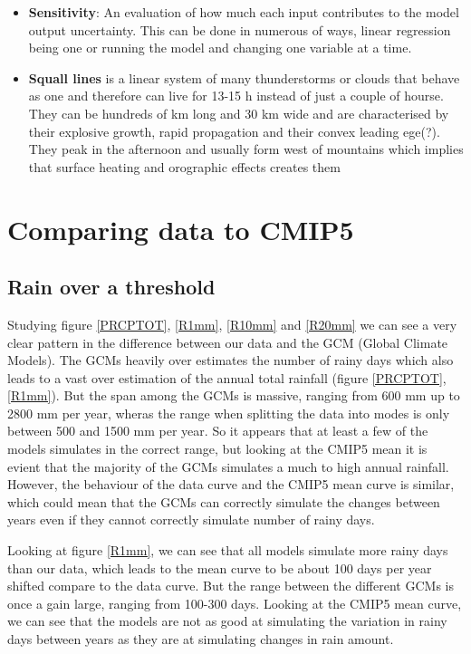 \documentclass{article}
\begin{document}
\begin{itemize}
		\item \textbf{Sensitivity}: An evaluation of how much each input contributes to the model output uncertainty. This can be done in numerous of ways, linear regression being one or running the model and changing one variable at a time.
		\item \textbf{Squall lines} is a linear system of many thunderstorms or clouds that behave as one and therefore can live for 13-15 h instead of just a couple of hourse. They can be hundreds of km long and 30 km wide and are characterised by their explosive growth, rapid propagation and their convex leading ege(?). They peak in the afternoon and usually form west of mountains which implies that surface heating and orographic  effects creates them
	\end{itemize}

	\section{Comparing data to CMIP5}
	\subsection{Rain over a threshold}
	Studying figure \ref{PRCPTOT}, \ref{R1mm}, \ref{R10mm} and \ref{R20mm} we can see a very clear pattern in the difference between our data and the GCM (Global Climate Models). The GCMs heavily over estimates the number of rainy days which also leads to a vast over estimation of the annual total rainfall (figure \ref{PRCPTOT}, \ref{R1mm}). But the span among the GCMs is massive, ranging from 600 mm up to 2800 mm per year, wheras the range when splitting the data into modes is only between 500 and 1500 mm per year. So it appears that at least a few of the models simulates in the correct range, but looking at the CMIP5 mean it is evient that the majority of the GCMs simulates a much to high annual rainfall. However, the behaviour of the data curve and the CMIP5 mean curve is similar, which could mean that the GCMs can correctly simulate the changes between years even if they cannot correctly  simulate number of rainy days.
	
	Looking at figure \ref{R1mm}, we can see that all models simulate more rainy days than our data, which leads to the mean curve to be about 100 days per year shifted compare to the data curve. But the range between the different GCMs is once a gain large, ranging from 100-300 days. Looking at the CMIP5 mean curve, we can see that the models are not as good at simulating the variation in rainy days between years as they are at simulating changes in rain amount. 
	
\end{document}
